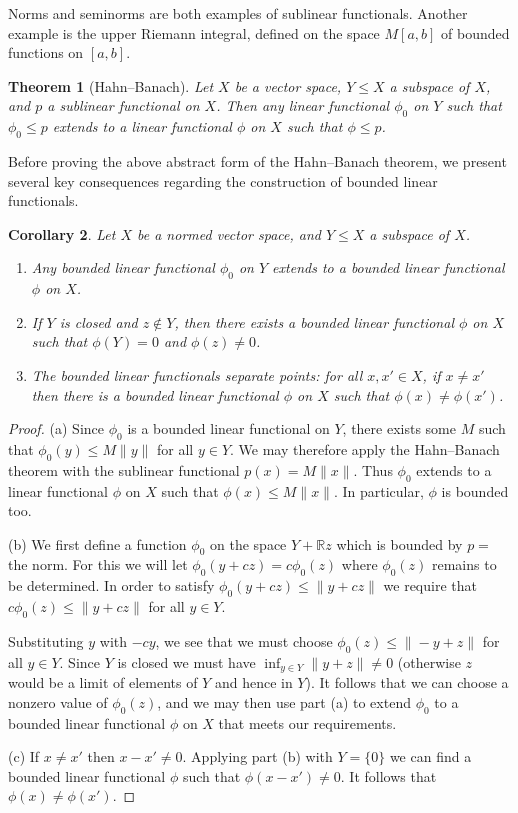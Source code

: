 \documentclass[11pt,oneside]{amsbook}
\newcommand{\RR}{{\mathbb R}}
\theoremstyle{definition}
\theoremstyle{plain}
\newtheorem{thm}{Theorem}[section]
\newtheorem{cor}[thm]{Corollary}
\theoremstyle{definition}
\theoremstyle{remark}
\numberwithin{equation}{section}
\numberwithin{figure}{section}
\begin{document}
Norms and seminorms are both examples of sublinear functionals. Another example is the upper Riemann integral, defined on the space $M[a,b]$ of bounded functions on $[a,b]$.

\begin{thm}[Hahn--Banach]
  \label{thm:hb}
  Let $X$ be a vector space, $Y\leq X$ a subspace of $X$, and $p$ a sublinear functional on $X$. Then any linear functional $\phi_0$ on $Y$ such that $\phi_0\leq p$ extends to a linear functional $\phi$ on $X$ such that $\phi\leq p$.
\end{thm}

Before proving the above abstract form of the Hahn--Banach theorem, we present several key consequences regarding the construction of bounded linear functionals.

\begin{cor}
  \label{cor:hb}
  Let $X$ be a normed vector space, and $Y\leq X$ a subspace of $X$.
  \begin{enumerate}
  \item Any bounded linear functional $\phi_0$ on $Y$ extends to a bounded linear functional $\phi$ on $X$.
  \item If $Y$ is closed and $z\notin Y$, then there exists a bounded linear functional $\phi$ on $X$ such that $\phi(Y)=0$ and $\phi(z)\neq0$.
  \item The bounded linear functionals separate points: for all $x,x'\in X$, if $x\neq x'$ then there is a bounded linear functional $\phi$ on $X$ such that $\phi(x)\neq\phi(x')$.
  \end{enumerate}
\end{cor}

\begin{proof}
  (a) Since $\phi_0$ is a bounded linear functional on $Y$, there exists some $M$ such that $\phi_0(y)\leq M\|y\|$ for all $y\in Y$. We may therefore apply the Hahn--Banach theorem with the sublinear functional $p(x)=M\|x\|$. Thus $\phi_0$ extends to a linear functional $\phi$ on $X$ such that $\phi(x)\leq M\|x\|$. In particular, $\phi$ is bounded too.

  (b) We first define a function $\phi_0$ on the space $Y+\RR z$ which is bounded by $p=$ the norm. For this we will let $\phi_0(y+cz)=c\phi_0(z)$ where $\phi_0(z)$ remains to be determined. In order to satisfy $\phi_0(y+cz)\leq\|y+cz\|$ we require that $c\phi_0(z)\leq\|y+cz\|$ for all $y\in Y$.

  Substituting $y$ with $-cy$, we see that we must choose $\phi_0(z)\leq\|-y+z\|$ for all $y\in Y$. Since $Y$ is closed we must have $\inf_{y\in Y}\|y+z\|\neq0$ (otherwise $z$ would be a limit of elements of $Y$ and hence in $Y$). It follows that we can choose a nonzero value of $\phi_0(z)$, and we may then use part (a) to extend $\phi_0$ to a bounded linear functional $\phi$ on $X$ that meets our requirements.

  (c) If $x\neq x'$ then $x-x'\neq0$. Applying part (b) with $Y=\{0\}$ we can find a bounded linear functional $\phi$ such that $\phi(x-x')\neq0$. It follows that $\phi(x)\neq\phi(x')$.
\end{proof}
\end{document}
